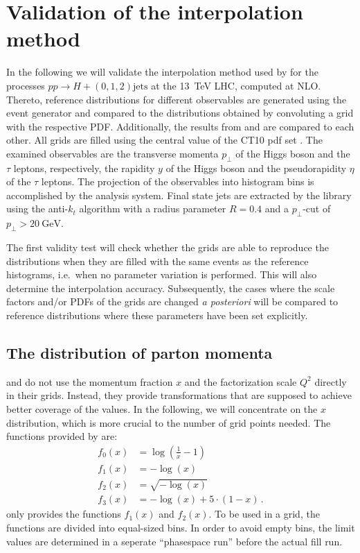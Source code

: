 
\chapter{Validation of the interpolation method}
In the following we will validate the interpolation method used by \mcgrid{} for the processes $pp \rightarrow H + (0,1,2) \text{jets}$ at the \SI{13}{\tera\electronvolt} LHC, computed at NLO.
Thereto, reference distributions for different observables are generated using the \sherpa{} event generator and compared to the distributions obtained by convoluting a grid with the respective PDF.
Additionally, the results from \appl{} and \fnlo{} are compared to each other.
All grids are filled using the central value of the CT10 pdf set \cite{ct10}.
The examined observables are the transverse momenta $p_\perp$ of the Higgs boson and the $\tau$ leptons, respectively, the rapidity $y$ of the Higgs boson and the pseudorapidity $\eta$ of the $\tau$ leptons.
The projection of the observables into histogram bins is accomplished by the \rivet{} analysis system.
Final state jets are extracted by the \fastjet{} library \cite{fastjet_manual} using the anti-$k_t$ algorithm \cite{anti_kt} with a radius parameter $R=0.4$ and a $p_\perp$-cut of $p_\perp > \SI{20}{\giga\electronvolt}$.

The first validity test will check whether the grids are able to reproduce the distributions when they are filled with the same events as the reference histograms, i.e.\ when no parameter variation is performed.
This will also determine the interpolation accuracy.
Subsequently, the cases where the scale factors and/or PDFs of the grids are changed \textit{a posteriori} will be compared to reference distributions where these parameters have been set explicitly.
%
\section{The distribution of parton momenta}
\label{sec:xtransform}
\appl{} and \fnlo{} do not use the momentum fraction $x$ and the factorization scale $Q^2$ directly in their grids.
Instead, they provide transformations that are supposed to achieve better coverage of the values.
In the following, we will concentrate on the $x$ distribution, which is more crucial to the number of grid points needed.
The functions provided by \appl{} are:
%
\begin{align}
	f_0(x)	&= \log(\frac{1}{x} -1) \\
	f_1(x)	&= -\log(x) \\
	f_2(x)	&= \sqrt{-\log(x)} \\
	f_3(x)	&= -\log(x) + 5 \cdot (1-x) \, .
\end{align}
%
\fnlo{} only provides the functions $f_1(x)$ and $f_2(x)$.
To be used in a grid, the functions are divided into equal-sized bins.
In order to avoid empty bins, the limit values are determined in a seperate \enquote{phasespace run} before the actual fill run.

